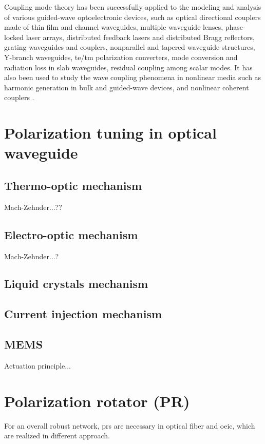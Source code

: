 \documentclass[../report.tex]{subfiles}
\begin{document}
\par 
Coupling mode theory has been successfully applied to the modeling and analysis of various guided-wave optoelectronic devices, such as optical directional couplers made of thin film and channel waveguides, multiple waveguide lenses, phase-locked laser arrays, distributed feedback lasers and distributed Bragg reflectors, grating waveguides and couplers, nonparallel and tapered waveguide structures, Y-branch waveguides, \gls{te}/\gls{tm} polarization converters, mode conversion and radiation loss in slab waveguides, residual coupling among scalar modes. It has also been used to study the wave coupling phenomena in nonlinear media such as harmonic generation in bulk and guided-wave devices, and nonlinear coherent couplers \cite{haus_coupled_1991}.
	
	\section{Polarization tuning in optical waveguide}
		\subsection{Thermo-optic mechanism}
		Mach-Zehnder...?? 
		
		\subsection{Electro-optic mechanism}
		Mach-Zehnder...? 
		
		\subsection{Liquid crystals mechanism}
		
		\subsection{Current injection mechanism}
		
		\subsection{MEMS}
		Actuation principle... 	
			
	\section{Polarization rotator (PR)}
For an overall robust network, \gls{pr}s are necessary in optical fiber and \gls{oeic}, which are realized in different approach.	
\end{document}
